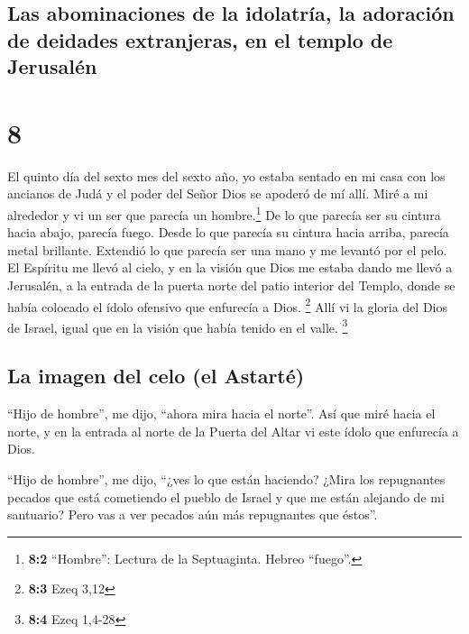 \hypertarget{las-abominaciones-de-la-idolatruxeda-la-adoraciuxf3n-de-deidades-extranjeras-en-el-templo-de-jerusaluxe9n}{%
\subsection{Las abominaciones de la idolatría, la adoración de deidades
extranjeras, en el templo de
Jerusalén}\label{las-abominaciones-de-la-idolatruxeda-la-adoraciuxf3n-de-deidades-extranjeras-en-el-templo-de-jerusaluxe9n}}

\hypertarget{section-7}{%
\section{8}\label{section-7}}

 El quinto día del sexto mes del sexto año, yo estaba
sentado en mi casa con los ancianos de Judá y el poder del Señor Dios se
apoderó de mí allí.  Miré a mi alrededor y vi un ser que
parecía un hombre.\footnote{\textbf{8:2} ``Hombre'': Lectura de la
  Septuaginta. Hebreo ``fuego''.} De lo que parecía ser su cintura hacia
abajo, parecía fuego. Desde lo que parecía su cintura hacia arriba,
parecía metal brillante.  Extendió lo que parecía ser una
mano y me levantó por el pelo. El Espíritu me llevó al cielo, y en la
visión que Dios me estaba dando me llevó a Jerusalén, a la entrada de la
puerta norte del patio interior del Templo, donde se había colocado el
ídolo ofensivo que enfurecía a Dios. \footnote{\textbf{8:3} Ezeq 3,12}
 Allí vi la gloria del Dios de Israel, igual que en la
visión que había tenido en el valle. \footnote{\textbf{8:4} Ezeq 1,4-28}

\hypertarget{la-imagen-del-celo-el-astartuxe9}{%
\subsection{La imagen del celo (el
Astarté)}\label{la-imagen-del-celo-el-astartuxe9}}

 ``Hijo de hombre'', me dijo, ``ahora mira hacia el
norte''. Así que miré hacia el norte, y en la entrada al norte de la
Puerta del Altar vi este ídolo que enfurecía a Dios.

 ``Hijo de hombre'', me dijo, ``¿ves lo que están
haciendo? ¿Mira los repugnantes pecados que está cometiendo el pueblo de
Israel y que me están alejando de mi santuario? Pero vas a ver pecados
aún más repugnantes que éstos''.

